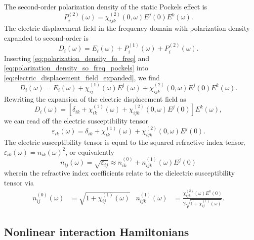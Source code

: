 The second-order polarization density of the static Pockels effect is~\cite[p.~495]{Boyd2020}
\begin{equation}
	P_i^{(2)}(\omega)
	=
	\chi^{(2)}_{ijk}(0,\omega)
	E^j(0)
	E^k(\omega)
	.
	\label{eq:polarization_density_so_freq_pockels}
\end{equation}
The electric displacement field in the frequency domain with polarization density expanded to second-order is~\cite[p.~1070]{Mandel1995}
\begin{equation}
	D_i(\omega)
	=
	E_i(\omega)
	+
	P_i^{(1)}(\omega)
	+
	P_i^{(2)}(\omega)
	.
	\label{eq:electric_displacement_field_expanded}
\end{equation}
Inserting \cref{eq:polarization_density_fo_freq} and \cref{eq:polarization_density_so_freq_pockels} into \cref{eq:electric_displacement_field_expanded}, we find
\begin{equation}
	D_i(\omega)
	=
	E_i(\omega)
	+
	\chi^{(1)}_{ij}(\omega)
	E^j(\omega)
	+
	\chi^{(2)}_{ijk}(0,\omega)
	E^j(0)
	E^k(\omega)
	.
\end{equation}
Rewriting the expansion of the electric displacement field as
\begin{equation}
	D_i(\omega)
	=
	\left[
		\delta_{ik}
		+
		\chi^{(1)}_{ik}(\omega)
		+
		\chi^{(2)}_{ijk}(0,\omega)
		E^j(0)
	\right]
	E^k(\omega)
	,
\end{equation}
we can read off the electric susceptibility tensor
\begin{equation}
	\varepsilon_{ik}(\omega)
	=
	\delta_{ik}
	+
	\chi^{(1)}_{ik}(\omega)
	+
	\chi^{(2)}_{ijk}(0,\omega)
	E^j(0)
	.
\end{equation}
The electric susceptibility tensor is equal to the squared refractive index tensor, $\varepsilon_{ik}(\omega)=n_{ik}(\omega)^2$, or equivalently~\cite[p.~3]{Brooker2003}
\begin{equation}
	n_{ij}(\omega)
	=
	\sqrt{\varepsilon_{ij}}
	\approx
	n_{ik}^{(0)}
	+
	n_{ijk}^{(1)}(\omega)
	E^j(0)
\end{equation}
wherein the refractive index coefficients relate to the dielectric susceptibility tensor via~\cite{Rerat2020}
\begin{align}
	n^{(0)}_{ij}(\omega)
	&=
	\sqrt{1+\chi^{(1)}_{ij}(\omega)}
	&
	n^{(1)}_{ijk}(\omega)
	&=
	\frac{\chi^{(2)}_{ijk}(\omega)
	E^k(0)}{2\sqrt{1+\chi^{(1)}_{ij}(\omega)}}
	.
\end{align}

\subsection{Nonlinear interaction Hamiltonians}

